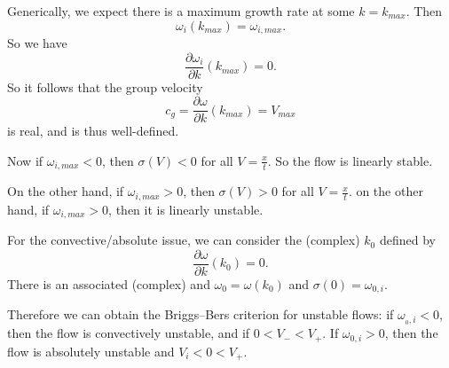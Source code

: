 \documentclass[a4paper]{article}
\begin{document}
Generically, we expect there is a maximum growth rate at some $k = k_{max}$. Then
\[
  \omega_i(k_{max}) = \omega_{i, max}.
\]
So we have
\[
  \frac{\partial \omega_i}{\partial k} (k_{max}) = 0.
\]
So it follows that the group velocity
\[
  c_g = \frac{\partial \omega}{\partial k}(k_{max}) = V_{max}
\]
is real, and is thus well-defined.

Now if $\omega_{i, max} < 0$, then $\sigma(V) < 0$ for all $V = \frac{x}{t}$. So the flow is linearly stable.

On the other hand, if $\omega_{i, max} > 0$, then $\sigma(V) > 0$ for all $V = \frac{x}{t}$. on the other hand, if $\omega_{i, max} > 0$, then it is linearly unstable.

For the convective/absolute issue, we can consider the (complex)  $k_0$ defined by
\[
  \frac{\partial \omega}{\partial k}(k_0) = 0.
\]
There is an associated (complex)  and  $\omega_0 = \omega(k_0)$ and $\sigma(0) = \omega_{0, i}$.

Therefore we can obtain the Briggs--Bers criterion for unstable flows: if $\omega_{_0, i} < 0$, then the flow is convectively unstable, and if $0 < V_- < V_+$. If $\omega_{0,i} > 0$, then the flow is absolutely unstable and $V_i < 0 < V_+$.
\end{document}
